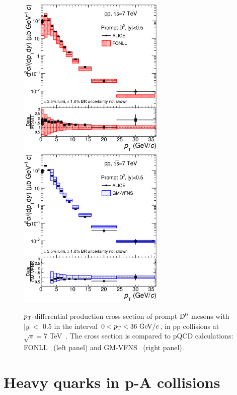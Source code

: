 \begin{figure}[!ht]
  \centering
  \includegraphics[width=7cm]{FigCap2/DzeroppCrossSecVsFONLLAndRatio.eps}
  \includegraphics[width=7cm]{FigCap2/DzeroppCrossSecVsGMVFNSAndRatio.eps}
  \caption{$p_{\rm T}$-differential production cross section of prompt ${\rm D^0}$ mesons with $|y| < $ 0.5 in the interval $0 < p_{\rm T} < 36 ~\mathrm{GeV}/c$, in pp collisions at $\sqrt{s} = 7$ TeV~\cite{Acharya:2017jgo}. The cross section is compared to pQCD calculations: FONLL~\cite{Cacciari:1998it,Cacciari:2001td} (left panel) and GM-VFNS~\cite{Kniehl:2004fy} (right panel).}
  \label{fig:CharmXsec}
\end{figure}

\section{Heavy quarks in p-A collisions}
